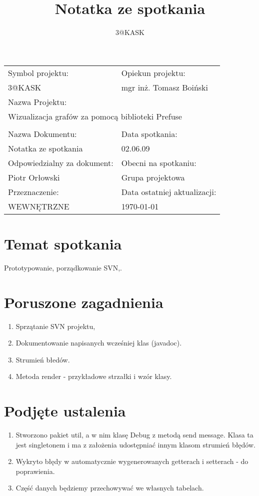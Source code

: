 \documentclass[a4paper,10pt]{article}
\title{Notatka ze spotkania}
\author{3@KASK}
\begin{document}



\maketitle


\begin{center}
\begin{tabular}{|p{7cm}|p{7cm}|}
\hline
Symbol projektu: & Opiekun projektu:   \tabularnewline
3@KASK & mgr inż. Tomasz Boiński    \tabularnewline \hline
\multicolumn{2}{|l|}{Nazwa Projektu: } \tabularnewline
\multicolumn{2}{|l|}{Wizualizacja grafów za pomocą biblioteki Prefuse } \tabularnewline
\hline
\multicolumn{2}{l}{ } \tabularnewline %
\hline
Nazwa Dokumentu: & Data spotkania:   \tabularnewline
Notatka ze spotkania & 02.06.09 \tabularnewline \hline
Odpowiedzialny za dokument: & Obecni na spotkaniu:   \tabularnewline
Piotr Orłowski & Grupa projektowa \tabularnewline \hline
Przeznaczenie: & Data ostatniej aktualizacji:   \tabularnewline
WEWNĘTRZNE & \today \tabularnewline \hline
\end{tabular}
\end{center}



\section{Temat spotkania}
Prototypowanie, porządkowanie SVN,.

\section{Poruszone zagadnienia}
\begin{enumerate}
\item Sprzątanie SVN projektu,
\item Dokumentowanie napisanych wcześniej klas (javadoc).
\item Strumień błedów.
\item Metoda render - przykładowe strzałki i wzór klasy.
\end{enumerate}


\section{Podjęte ustalenia}
\begin{enumerate}
\item Stworzono pakiet util, a w nim klasę Debug z metodą send message. Klasa ta jest singletonem i ma z założenia udostępniać innym klasom strumień błędów.
\item Wykryto błędy w automatycznie wygenerowanych getterach i setterach - do poprawienia.
\item Część danych będziemy przechowywać we własnych tabelach.
\end{enumerate}



\clearpage
{}
{}

\end{document}
